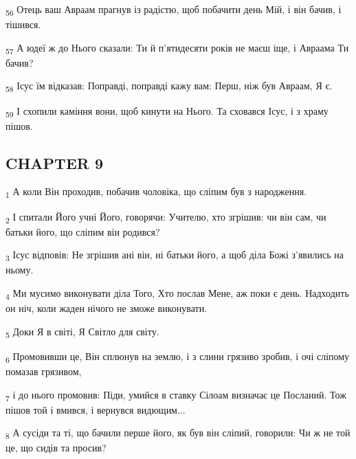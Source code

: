 \begin{tcolorbox}
\textsubscript{56} Отець ваш Авраам прагнув із радістю, щоб побачити день Мій, і він бачив, і тішився.
\end{tcolorbox}
\begin{tcolorbox}
\textsubscript{57} А юдеї ж до Нього сказали: Ти й п'ятидесяти років не маєш іще, і Авраама Ти бачив?
\end{tcolorbox}
\begin{tcolorbox}
\textsubscript{58} Ісус їм відказав: Поправді, поправді кажу вам: Перш, ніж був Авраам, Я є.
\end{tcolorbox}
\begin{tcolorbox}
\textsubscript{59} І схопили каміння вони, щоб кинути на Нього. Та сховався Ісус, і з храму пішов.
\end{tcolorbox}
\subsection{CHAPTER 9}
\begin{tcolorbox}
\textsubscript{1} А коли Він проходив, побачив чоловіка, що сліпим був з народження.
\end{tcolorbox}
\begin{tcolorbox}
\textsubscript{2} І спитали Його учні Його, говорячи: Учителю, хто згрішив: чи він сам, чи батьки його, що сліпим він родився?
\end{tcolorbox}
\begin{tcolorbox}
\textsubscript{3} Ісус відповів: Не згрішив ані він, ні батьки його, а щоб діла Божі з'явились на ньому.
\end{tcolorbox}
\begin{tcolorbox}
\textsubscript{4} Ми мусимо виконувати діла Того, Хто послав Мене, аж поки є день. Надходить он ніч, коли жаден нічого не зможе виконувати.
\end{tcolorbox}
\begin{tcolorbox}
\textsubscript{5} Доки Я в світі, Я Світло для світу.
\end{tcolorbox}
\begin{tcolorbox}
\textsubscript{6} Промовивши це, Він сплюнув на землю, і з слини грязиво зробив, і очі сліпому помазав грязивом,
\end{tcolorbox}
\begin{tcolorbox}
\textsubscript{7} і до нього промовив: Піди, умийся в ставку Сілоам визначає це Посланий. Тож пішов той і вмився, і вернувся видющим...
\end{tcolorbox}
\begin{tcolorbox}
\textsubscript{8} А сусіди та ті, що бачили перше його, як був він сліпий, говорили: Чи ж не той це, що сидів та просив?
\end{tcolorbox}
